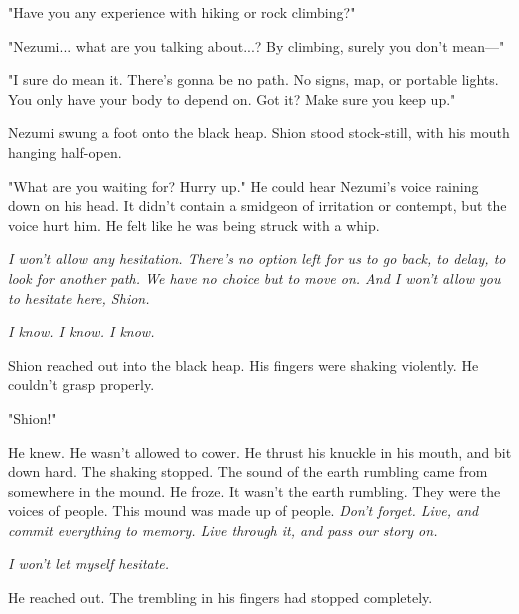 "Have you any experience with hiking or rock climbing?"

"Nezumi... what are you talking about...? By climbing, surely you don't
mean---"

"I sure do mean it. There's gonna be no path. No signs, map, or portable
lights. You only have your body to depend on. Got it? Make sure you keep
up."

Nezumi swung a foot onto the black heap. Shion stood stock-still, with
his mouth hanging half-open.

"What are you waiting for? Hurry up." He could hear Nezumi's voice
raining down on his head. It didn't contain a smidgeon of irritation or
contempt, but the voice hurt him. He felt like he was being struck with
a whip.

\emph{I won't allow any hesitation. There's no option left for us to go back,
to delay, to look for another path. We have no choice but to move on.
And I won't allow you to hesitate here, Shion.}

\emph{I know. I know. I know.}

Shion reached out into the black heap. His fingers were shaking
violently. He couldn't grasp properly.

"Shion!"

He knew. He wasn't allowed to cower. He thrust his knuckle in his mouth,
and bit down hard. The shaking stopped. The sound of the earth rumbling
came from somewhere in the mound. He froze. It wasn't the earth
rumbling. They were the voices of people. This mound was made up of
people. \emph{Don't forget. Live, and commit everything to memory. Live
through it, and pass our story on.}

\emph{I won't let myself hesitate.}

He reached out. The trembling in his fingers had stopped completely.